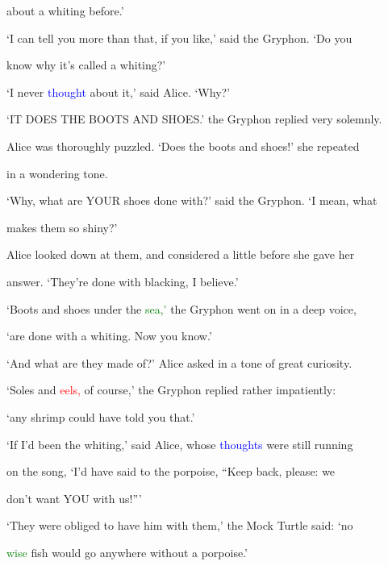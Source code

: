  about a \textcolor{BurntOrange}{whiting} before.’



 ‘I can tell you more than that, if you like,’ said the Gryphon. ‘Do you

 know why it’s called a \textcolor{BurntOrange}{whiting?’}



 ‘I never \textcolor{blue}{thought} about it,’ said Alice. ‘Why?’



 ‘IT DOES THE BOOTS AND SHOES.’ the Gryphon replied very solemnly.



 Alice was thoroughly puzzled. ‘Does the boots and shoes!’ she repeated

 in a wondering tone.



 ‘Why, what are YOUR shoes done with?’ said the Gryphon. ‘I mean, what

 makes them so shiny?’



 Alice looked down at them, and considered a little before she gave her

 answer. ‘They’re done with blacking, I believe.’



 ‘Boots and shoes under the \textcolor{green}{sea,’} the Gryphon went on in a deep voice,

 ‘are done with a \textcolor{BurntOrange}{whiting.} Now you know.’



 ‘And what are they made of?’ Alice asked in a tone of great \textcolor{BurntOrange}{curiosity.}



 ‘Soles and \textcolor{red}{eels,} of course,’ the Gryphon replied rather impatiently:

 ‘any shrimp could have told you that.’



 ‘If I’d been the \textcolor{BurntOrange}{whiting,’} said Alice, whose \textcolor{blue}{thoughts} were still running

 on the song, ‘I’d have said to the porpoise, “Keep back, please: we

 don’t want YOU with us!”’



 ‘They were \textcolor{BurntOrange}{obliged} to have him with them,’ the Mock Turtle said: ‘no

 \textcolor{green}{wise} fish would go anywhere without a porpoise.’



